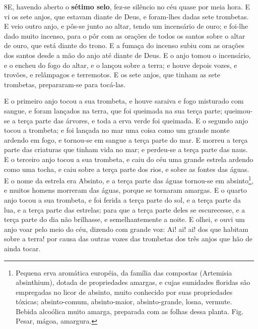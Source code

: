 \medskip

\lettrine{8} E, havendo aberto o \textbf{sétimo selo}, fez-se
silêncio no céu quase por meia hora. E vi os sete anjos, que
estavam diante de Deus, e foram-lhes dadas sete trombetas. E
veio outro anjo, e pôs-se junto ao altar, tendo um incensário de
ouro; e foi-lhe dado muito incenso, para o pôr com as orações de
todos os santos sobre o altar de ouro, que está diante do trono.
E a fumaça do incenso subiu com as orações dos santos desde a
mão do anjo até diante de Deus. E o anjo tomou o incensário, e o
encheu do fogo do altar, e o lançou sobre a terra; e houve depois
vozes, e trovões, e relâmpagos e terremotos. E os sete anjos,
que tinham as sete trombetas, prepararam-se para tocá-las.

E o primeiro anjo tocou a sua trombeta, e houve saraiva e fogo
misturado com sangue, e foram lançados na terra, que foi queimada na
sua terça parte; queimou-se a terça parte das árvores, e toda a erva
verde foi queimada. E o segundo anjo tocou a trombeta; e foi
lançada no mar uma coisa como um grande monte ardendo em fogo, e
tornou-se em sangue a terça parte do mar. E morreu a terça parte
das criaturas que tinham vida no mar; e perdeu-se a terça parte das
naus. E o terceiro anjo tocou a sua trombeta, e caiu do céu
uma grande estrela ardendo como uma tocha, e caiu sobre a terça
parte dos rios, e sobre as fontes das águas. E o nome da
estrela era Absinto, e a terça parte das águas tornou-se em
absinto\footnote{Pequena erva aromática européia, da família das
compostas (Artemisia absinthium), dotada de propriedades amargas, e
cujas sumidades floridas são empregadas no licor de absinto, muito
conhecido por suas propriedades tóxicas; absinto-comum,
absinto-maior, absinto-grande, losna, vermute. Bebida alcoólica
muito amarga, preparada com as folhas dessa planta. Fig. Pesar,
mágoa, amargura.}, e muitos homens morreram das águas, porque se
tornaram amargas. E o quarto anjo tocou a sua trombeta, e foi
ferida a terça parte do sol, e a terça parte da lua, e a terça parte
das estrelas; para que a terça parte deles se escurecesse, e a terça
parte do dia não brilhasse, e semelhantemente a noite. E
olhei, e ouvi um anjo voar pelo meio do céu, dizendo com grande voz:
Ai! ai! ai! dos que habitam sobre a terra! por causa das outras
vozes das trombetas dos três anjos que hão de ainda tocar.

\medskip

